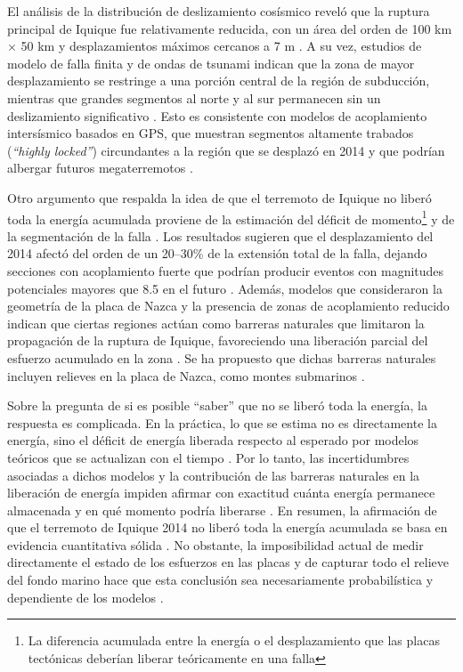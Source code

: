 \documentclass[a4paper,12pt]{article} %
\numberwithin{equation}{section} %
\numberwithin{figure}{section} %
\begin{document}
El análisis de la distribución de deslizamiento cosísmico reveló que la ruptura principal de Iquique fue relativamente reducida, con un área del orden de 100 km $\times$ 50 km y desplazamientos máximos cercanos a 7 m \cite{Duputel_Iquique2015,Watada_Iquique2014}. A su vez, estudios de modelo de falla finita y de ondas de tsunami indican que la zona de mayor desplazamiento se restringe a una porción central de la región de subducción, mientras que grandes segmentos al norte y al sur permanecen sin un deslizamiento significativo \cite{Watada_Iquique2014}. Esto es consistente con modelos de acoplamiento intersísmico basados en GPS, que muestran segmentos altamente trabados (\textit{“highly locked”}) circundantes a la región que se desplazó en 2014 y que podrían albergar futuros megaterremotos \cite{Metois_NorthChileGap2013,Hayes_Iquique2014}.

Otro argumento que respalda la idea de que el terremoto de Iquique no liberó toda la energía acumulada proviene de la estimación del déficit de momento\footnote{La diferencia acumulada entre la energía o el desplazamiento que las placas tectónicas deberían liberar teóricamente en una falla} y de la segmentación de la falla \cite{Hayes_Iquique2014,Schurr_IquiqueGap2014}. Los resultados sugieren que el desplazamiento del 2014 afectó del orden de un 20--30\% de la extensión total de la falla, dejando secciones con acoplamiento fuerte que podrían producir eventos con magnitudes potenciales mayores que 8.5 en el futuro \cite{Hayes_Iquique2014}. Además, modelos que consideraron la geometría de la placa de Nazca y la presencia de zonas de acoplamiento reducido indican que ciertas regiones actúan como barreras naturales que limitaron la propagación de la ruptura de Iquique, favoreciendo una liberación parcial del esfuerzo acumulado en la zona \cite{Metois_NorthChileGap2013,Schurr_IquiqueGap2014}.  Se ha propuesto que dichas barreras naturales incluyen relieves en la placa de Nazca, como montes submarinos \cite{Geersen_Seamounts2016}.

Sobre la pregunta de si es posible “saber” que no se liberó toda la energía, la respuesta es complicada. En la práctica, lo que se estima no es directamente la energía, sino el déficit de energía liberada respecto al esperado por modelos teóricos que se actualizan con el tiempo \cite{Metois_NorthChileGap2013,Hayes_Iquique2014}. Por lo tanto, las incertidumbres asociadas a dichos modelos y la contribución de las barreras naturales en la liberación de energía impiden afirmar con exactitud cuánta energía permanece almacenada y en qué momento podría liberarse \cite{Nucleation_Iquique2016,Eskp_IquiqueHazard2014}.  En resumen, la afirmación de que el terremoto de Iquique 2014 no liberó toda la energía acumulada se basa en evidencia cuantitativa sólida \cite{Hayes_Iquique2014,Duputel_Iquique2015}. No obstante, la imposibilidad actual de medir directamente el estado de los esfuerzos en las placas y de capturar todo el relieve del fondo marino hace que esta conclusión sea necesariamente probabilística y dependiente de los modelos \cite{Cesca_Iquique2016,Eskp_IquiqueHazard2014,USGS_Iquique2014}.
\end{document}
